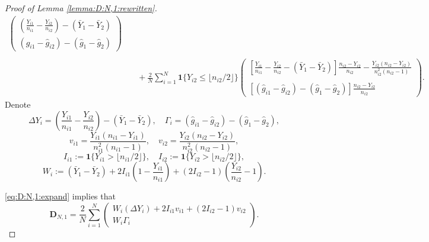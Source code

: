 \documentclass[12pt,letterpaper]{article}
\begin{document}
\begin{proof}[Proof of Lemma \ref{lemma:D:N,1:rewritten}]
\begin{equation}
\begin{array}{rl}
\begin{pmatrix}
\displaystyle\left(\frac{Y_{i1}}{n_{i1}}-\frac{Y_{i2}}{n_{i2}}\right)-(\bar{Y}_1-\bar{Y}_2)\\
\displaystyle(\hat{g}_{i1}-\hat{g}_{i2})-(\hat{g}_1-\hat{g}_2)
\end{pmatrix}\\
\\
&\displaystyle\quad+\frac{2}{N}\sum_{i=1}^N\mathbf{1}\{Y_{i2}\leq \lfloor n_{i2}/2\rfloor\}\begin{pmatrix}
\displaystyle\left[\frac{Y_{i1}}{n_{i1}}-\frac{Y_{i2}}{n_{i2}}-(\bar{Y}_1-\bar{Y}_2)\right]\frac{n_{i2}-Y_{i2}}{n_{i2}}-\frac{Y_{i2}(n_{i2}-Y_{i2})}{n_{i2}^2(n_{i2}-1)}\\
\\
\displaystyle[(\hat{g}_{i1}-\hat{g}_{i2})-(\hat{g}_1-\hat{g}_2)]\frac{n_{i2}-Y_{i2}}{n_{i2}}
\end{pmatrix}.
\end{array}
\end{equation}
Denote 
$$\Delta Y_i=\left(\frac{Y_{i1}}{n_{i1}}-\frac{Y_{i2}}{n_{i2}}\right)-(\bar{Y}_1-\bar{Y}_2),\quad \Gamma_i=(\hat{g}_{i1}-\hat{g}_{i2})-(\hat{g}_1-\hat{g}_2),$$
$$v_{i1}=\frac{Y_{i1}(n_{i1}-Y_{i1})}{n_{i1}^2(n_{i1}-1)},\quad v_{i2}=\frac{Y_{i2}(n_{i2}-Y_{i2})}{n_{i2}^2(n_{i2}-1)},$$
$$I_{i1}:=\mathbf{1}\{Y_{i1}>\lfloor n_{i1}/2\rfloor\},\quad I_{i2}:=\mathbf{1}\{Y_{i2}>\lfloor n_{i2}/2\rfloor\},$$
$$W_i:=(\bar{Y}_1-\bar{Y}_2)+2I_{i1}\left(1-\frac{Y_{i1}}{n_{i1}}\right)+(2I_{i2}-1)\left(\frac{Y_{i2}}{n_{i2}}-1\right).$$

\eqref{eq:D:N,1:expand} implies that
$$\mathbf{D}_{N,1}=\frac{2}{N}\sum_{i=1}^N\begin{pmatrix}
    W_i(\Delta Y_i)+2I_{i1}v_{i1}+(2I_{i2}-1)v_{i2}\\
    W_i\Gamma_i
\end{pmatrix}.$$

\end{proof}
\end{document}
